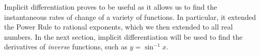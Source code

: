 Implicit differentiation proves to be useful as it allows us to find the instantaneous rates of change of a variety of functions. In particular, it extended the Power Rule to rational exponents, which we then extended to all real numbers. In the next section, implicit differentiation will be used to find the derivatives of \textit{inverse} functions, such as $y=\sin^{-1} x$.

%
%
%
%
%
%
%
%
%
%
%
